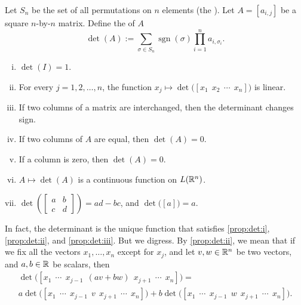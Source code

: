 Let $S_n$  be the set of all permutations on $n$ elements (the
\emph{}).
Let $A= [a_{i,j}]$ be a square $n$-by-$n$ matrix.  Define the \emph{} of $A$
\begin{equation*}
\det(A) := 
\sum_{\sigma \in S_n}
\operatorname{sgn} (\sigma) \prod_{i=1}^n a_{i,\sigma_i} .
\end{equation*}

\pagebreak[0]
\begin{prop}
\leavevmode
\begin{enumerate}[(i)]
\item \label{prop:det:i} $\det(I) = 1$.
\item \label{prop:det:ii} For every $j=1,2,\ldots,n$, the function $x_j
\mapsto \det\bigl([x_1 ~~ x_2 ~~ \cdots ~~ x_n ]\bigr)$
is linear.
\item \label{prop:det:iii} If two columns of a matrix are interchanged, then the determinant changes
sign.
\item \label{prop:det:iv} If two columns of $A$ are equal, then $\det(A) = 0$.
\item \label{prop:det:v} If a column is zero, then $\det(A) = 0$.
\item \label{prop:det:vi} $A \mapsto \det(A)$ is a continuous function on
$L({\mathbb{R}}^n)$.
\item \label{prop:det:vii} $\det\left( \left[\begin{smallmatrix} a & b \\ c
&d \end{smallmatrix}\right] \right)
= ad-bc$, and $\det \bigl( [a] \bigr) = a$.
\end{enumerate}
\end{prop}

In fact, the determinant is the unique function that satisfies
\ref{prop:det:i},
\ref{prop:det:ii}, and
\ref{prop:det:iii}.
But we digress.  By \ref{prop:det:ii}, we mean that if we fix all the vectors
$x_1,\ldots,x_n$ except for $x_j$, and let
$v,w \in {\mathbb{R}}^n$ be two vectors,
and $a,b \in {\mathbb{R}}$ be scalars, then
\begin{multline*}
\det\bigl([x_1 ~~ \cdots ~~ x_{j-1} ~~ (av+bw) ~~ x_{j+1} ~~ \cdots ~~
x_n]\bigr) =
\\
a \det\bigl([x_1 ~~ \cdots ~~ x_{j-1} ~~ v ~~ x_{j+1} ~~ \cdots ~~ x_n]\bigr)
+
b
\det\bigl([x_1 ~~ \cdots ~~ x_{j-1} ~~ w ~~ x_{j+1} ~~ \cdots ~~ x_n]\bigr) .
\end{multline*}

